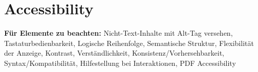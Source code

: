 
\section{Accessibility}


\textbf{Für Elemente zu beachten:} Nicht-Text-Inhalte mit Alt-Tag versehen, Tastaturbedienbarkeit, Logische Reihenfolge, Semantische Struktur, Flexibilität der Anzeige, Kontrast, Verständlichkeit, Konsistenz/Vorhersehbarkeit, Syntax/Kompatibilität, Hilfestellung bei Interaktionen, PDF Accessibility